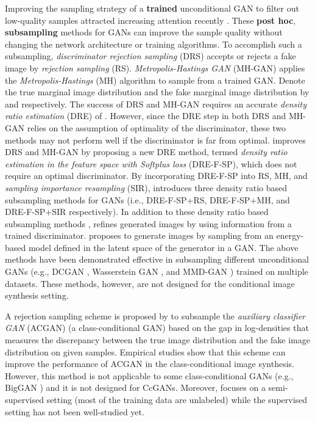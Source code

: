 \documentclass[10pt, twocolumn]{article}
\theoremstyle{definition}
\begin{document}
Improving the sampling strategy of a \textbf{trained} unconditional GAN to filter out low-quality samples attracted increasing attention recently \cite{azadi2018discriminator, turner2018metropolis, ding2020subsampling, liu2020collaborative, che2020your}. These \textbf{post hoc}, \textbf{subsampling} methods for GANs can improve the sample quality without changing the network architecture or training algorithms. To accomplish such a subsampling, \textit{discriminator rejection sampling} (DRS) \cite{azadi2018discriminator} accepts or rejects a fake image by \textit{rejection sampling} (RS). \textit{Metropolis-Hastings GAN} (MH-GAN) \cite{turner2018metropolis} applies the \textit{Metropolis-Hastings} (MH) algorithm to sample from a trained GAN. Denote the true marginal image distribution and the fake marginal image distribution by  and  respectively. The success of DRS and MH-GAN requires an accurate \textit{density ratio estimation} (DRE) of . However, since the DRE step in both DRS and MH-GAN relies on the assumption of optimality of the discriminator, these two methods may not perform well if the discriminator is far from optimal. \cite{ding2020subsampling} improves DRS and MH-GAN by proposing a new DRE method, termed \textit{density ratio estimation in the feature space with Softplus loss} (DRE-F-SP), which does not require an optimal discriminator. By incorporating DRE-F-SP into RS, MH, and \textit{sampling importance resampling} (SIR), \cite{ding2020subsampling} introduces three density ratio based subsampling methods for GANs (i.e., DRE-F-SP+RS, DRE-F-SP+MH, and DRE-F-SP+SIR respectively). In addition to these density ratio based subsampling methods \cite{azadi2018discriminator, turner2018metropolis, ding2020subsampling}, \cite{liu2020collaborative} refines generated images by using information from a trained discriminator. \cite{che2020your} proposes to generate images by sampling from an energy-based model defined in the latent space of the generator in a GAN. The above methods have been demonstrated effective in subsampling different unconditional GANs (e.g., DCGAN \cite{radford2015unsupervised}, Wasserstein GAN \cite{arjovsky2017wasserstein, gulrajani2017improved}, and MMD-GAN \cite{li2017mmd}) trained on multiple datasets. These methods, however, are not designed for the conditional image synthesis setting.

A rejection sampling scheme is proposed by \cite{mo2019mining} to subsample the \textit{auxiliary classifier GAN} (ACGAN) \cite{odena2017conditional} (a class-conditional GAN) based on the gap in log-densities that measures the discrepancy between the true image distribution and the fake image distribution on given samples. Empirical studies show that this scheme can improve the performance of ACGAN in the class-conditional image synthesis. However, this method is not applicable to some class-conditional GANs (e.g., BigGAN \cite{brock2018large}) and it is not designed for CcGANs. Moreover, \cite{mo2019mining} focuses on a semi-supervised setting (most of the training data are unlabeled) while the supervised setting has not been well-studied yet. 
\end{document}
